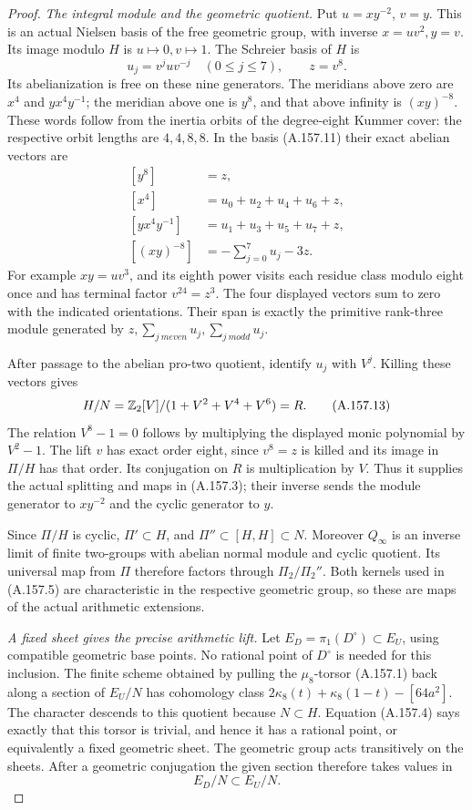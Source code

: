 \begin{proof}
\emph{The integral module and the geometric quotient.}
Put \(u=xy^{-2}\), \(v=y\).  This is an actual Nielsen
basis of the free geometric group, with inverse
\(x=uv^2,y=v\).  Its image modulo \(H\) is
\(u\mapsto0,v\mapsto1\).  The Schreier basis of \(H\) is
\[
 u_j=v^juv^{-j}\quad(0\leq j\leq7),\qquad z=v^8.
\tag{A.157.11}
\]
Its abelianization is free on these nine generators.
The meridians above zero are \(x^4\) and
\(yx^4y^{-1}\); the meridian above one is \(y^8\),
and that above infinity is \((xy)^{-8}\).
These words follow from the inertia orbits of the
degree-eight Kummer cover: the respective orbit
lengths are \(4,4,8,8\).
In the basis (A.157.11) their exact abelian vectors are
\[
 \begin{split}
 [y^8]&=z,\\
 [x^4]&=u_0+u_2+u_4+u_6+z,\\
 [yx^4y^{-1}]&=u_1+u_3+u_5+u_7+z,\\
 [(xy)^{-8}]&=-\sum_{j=0}^7u_j-3z.
 \end{split}
\tag{A.157.12}
\]
For example \(xy=uv^3\), and its eighth power visits
each residue class modulo eight once and has terminal
factor \(v^{24}=z^3\).  The four displayed vectors
sum to zero with the indicated orientations.
Their span is exactly the primitive rank-three module
generated by \(z,\sum_{j\ {
m even}}u_j,
\sum_{j\ {
m odd}}u_j\).

After passage to the abelian pro-two quotient, identify
\(u_j\) with \(V^j\).  Killing these vectors gives
\[
 H/N=\mathbb Z_2[V]/(1+V^2+V^4+V^6)=R.
\tag{A.157.13}
\]
The relation \(V^8-1=0\) follows by multiplying the
displayed monic polynomial by \(V^2-1\).
The lift \(v\) has exact order eight, since \(v^8=z\)
is killed and its image in \(\Pi/H\) has that order.
Its conjugation on \(R\) is multiplication by \(V\).
Thus it supplies the actual splitting and maps in
(A.157.3); their inverse sends the module generator
to \(xy^{-2}\) and the cyclic generator to \(y\).

Since \(\Pi/H\) is cyclic, \(\Pi'\subset H\), and
\(\Pi''\subset[H,H]\subset N\).  Moreover
\(Q_\infty\) is an inverse limit of finite two-groups
with abelian normal module and cyclic quotient.  Its
universal map from \(\Pi\) therefore factors through
\(\Pi_2/\Pi_2''\).  Both kernels used in (A.157.5)
are characteristic in the respective geometric group,
so these are maps of the actual arithmetic extensions.

\emph{A fixed sheet gives the precise arithmetic lift.}
Let \(E_D=\pi_1(D^\circ)\subset E_U\), using compatible
geometric base points.  No rational point of \(D^\circ\)
is needed for this inclusion.  The finite scheme obtained
by pulling the \(\mu_8\)-torsor (A.157.1) back along a
section of \(E_U/N\) has cohomology class
\(2\kappa_8(t)+\kappa_8(1-t)-[64a^2]\).
The character descends to this quotient because
\(N\subset H\).  Equation (A.157.4) says exactly that
this torsor is trivial, and hence it has a rational
point, or equivalently a fixed geometric sheet.
The geometric group acts transitively on the sheets.
After a geometric conjugation the given section
therefore takes values in
\[
                         E_D/N\subset E_U/N.
\tag{A.157.14}
\]


\end{proof}
